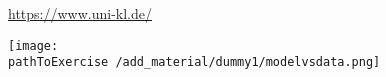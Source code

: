 
\url{https://www.uni-kl.de/}

\texttt{[image: \\pathToExercise /add\_material/dummy1/modelvsdata.png]}


